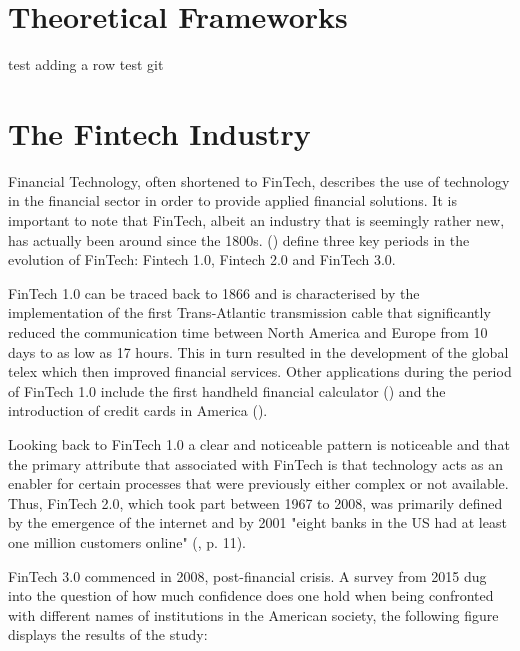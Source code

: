 \documentclass[12pt,a4paper]{article}
\begin{document}
\section{Theoretical Frameworks}
test
adding a row test git


\newpage
\section{The Fintech Industry} %
\label{fintech_industry}

Financial Technology, often shortened to FinTech, describes the use of technology in the financial sector in order to provide applied financial solutions.  It is important to note that FinTech, albeit an industry that is seemingly rather new, has actually been around since the 1800s. \citeauthor{buckleyEvolutionFintechNew2016} (\citeyear{buckleyEvolutionFintechNew2016}) define three key periods in the evolution of FinTech: Fintech 1.0, Fintech 2.0 and FinTech 3.0.\par
FinTech 1.0 can be traced back to 1866 and is characterised by the implementation of the first Trans-Atlantic transmission cable that significantly reduced the communication time between North America and Europe from 10 days to as low as 17 hours. This in turn resulted in the development of the global telex which then improved financial services. Other applications during the period of FinTech 1.0 include the first handheld financial calculator (\cite{thibodeauTIFirstHandheld2007}) and the introduction of credit cards in America (\cite{markhamFinancialHistoryUnited2015}). \par
Looking back to FinTech 1.0 a clear and noticeable pattern is noticeable and that the primary attribute that associated with FinTech is that technology acts as an enabler for certain processes that were previously either complex or not available. Thus, FinTech 2.0, which took part between 1967 to 2008, was primarily defined by the emergence of the internet and by 2001 "eight banks in the US had at least one million customers online"  (\cite{buckleyEvolutionFintechNew2016}, p. 11). \par 
FinTech 3.0 commenced in 2008, post-financial crisis. A survey from 2015 dug into the question of how much confidence does one hold when being confronted with different names of institutions in the American society,  the following figure displays the results of the study:
\end{document}
